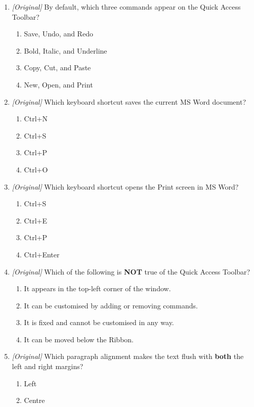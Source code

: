 \begin{enumerate}[label=\textbf{Q\arabic*.}, leftmargin=*]
\begin{enumerate}[label=\Alph*.]
  \end{enumerate}
\item \textit{[Original]} By default, which three commands appear on the
  Quick Access Toolbar?
  \begin{enumerate}[label=\Alph*.]
    \item Save, Undo, and Redo
    \item Bold, Italic, and Underline
    \item Copy, Cut, and Paste
    \item New, Open, and Print
  \end{enumerate}
\item \textit{[Original]} Which keyboard shortcut saves the current MS Word
  document?
  \begin{enumerate}[label=\Alph*.]
    \item Ctrl+N
    \item Ctrl+S
    \item Ctrl+P
    \item Ctrl+O
  \end{enumerate}
\item \textit{[Original]} Which keyboard shortcut opens the Print screen in
  MS Word?
  \begin{enumerate}[label=\Alph*.]
    \item Ctrl+S
    \item Ctrl+E
    \item Ctrl+P
    \item Ctrl+Enter
  \end{enumerate}
\item \textit{[Original]} Which of the following is \textbf{NOT} true of the
  Quick Access Toolbar?
  \begin{enumerate}[label=\Alph*.]
    \item It appears in the top-left corner of the window.
    \item It can be customised by adding or removing commands.
    \item It is fixed and cannot be customised in any way.
    \item It can be moved below the Ribbon.
  \end{enumerate}
\item \textit{[Original]} Which paragraph alignment makes the text flush with
  \textbf{both} the left and right margins?
  \begin{enumerate}[label=\Alph*.]
    \item Left
    \item Centre

\end{enumerate}
\end{enumerate}
